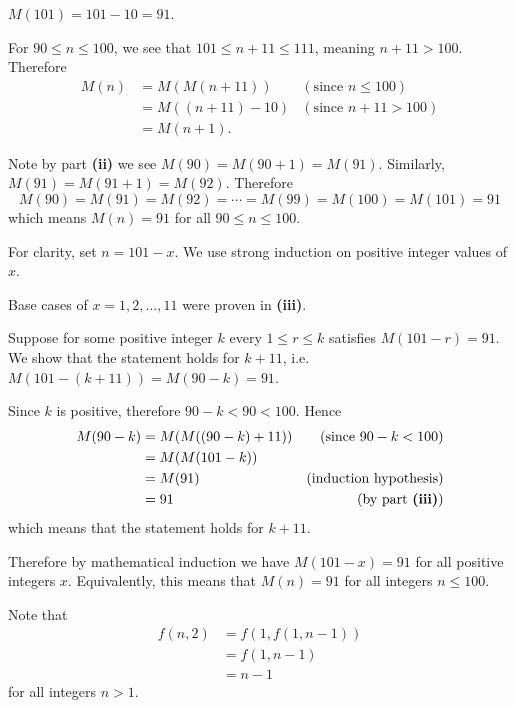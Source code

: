 \begin{questions}
    \item \begin{partquestions}{\roman*}
        \item $M(101) = 101 - 10 = 91$.

        \item For $90 \leq n \leq 100$, we see that $101 \leq n+11 \leq 111$, meaning $n+11 > 100$. Therefore
        \begin{align*}
            M(n) &= M(M(n+11)) & (\text{since } n \leq 100)\\
            &= M((n+11) - 10) & (\text{since } n+11 > 100)\\
            &= M(n+1).
        \end{align*}

        \item Note by part \textbf{(ii)} we see $M(90) = M(90 + 1) = M(91)$. Similarly, $M(91) = M(91 + 1) = M(92)$. Therefore
        \[
            M(90) = M(91) = M(92) = \cdots = M(99) = M(100) = M(101) = 91
        \]
        which means $M(n) = 91$ for all $90 \leq n \leq 100$.

        \item For clarity, set $n = 101 - x$. We use strong induction on positive integer values of $x$.

        Base cases of $x = 1, 2, \dots, 11$ were proven in \textbf{(iii)}.

        Suppose for some positive integer $k$ every $1 \leq r \leq k$ satisfies $M(101 - r) = 91$. We show that the statement holds for $k + 11$, i.e. $M(101 - (k+11)) = M(90 - k) = 91$.

        Since $k$ is positive, therefore $90 - k < 90 < 100$. Hence
        \begin{align*}
            M(90 - k) &= M(M((90 - k) + 11)) & (\text{since } 90-k < 100)\\
            &= M(M(101 - k))\\
            &= M(91) & (\text{induction hypothesis})\\
            &= 91 & (\text{by part \textbf{(iii)}})
        \end{align*}
        which means that the statement holds for $k + 11$.

        Therefore by mathematical induction we have $M(101 - x) = 91$ for all positive integers $x$. Equivalently, this means that $M(n) = 91$ for all integers $n \leq 100$.
    \end{partquestions}

    \item \begin{partquestions}{\roman*}
        \item Note that
        \begin{align*}
            f(n,2) &= f(1, f(1, n-1))\\
            &= f(1, n-1)\\
            &= n-1
        \end{align*}
        for all integers $n > 1$.


\end{partquestions}
\end{questions}
